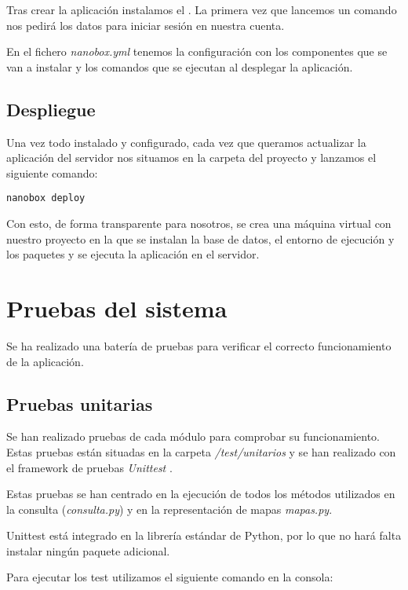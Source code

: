 Tras crear la aplicación instalamos el . La primera vez que lancemos un comando nos pedirá los datos para iniciar sesión en nuestra cuenta.

En el fichero \textit{nanobox.yml} tenemos la configuración con los componentes que se van a instalar y los comandos que se ejecutan al desplegar la aplicación.

\subsection{Despliegue}


Una vez todo instalado y configurado, cada vez que queramos actualizar la aplicación del servidor nos situamos en la carpeta del proyecto y lanzamos el siguiente comando:

\begin{lstlisting}
nanobox deploy
\end{lstlisting}

Con esto, de forma transparente para nosotros, se crea una máquina virtual con nuestro proyecto en la que se instalan la base de datos, el entorno de ejecución y los paquetes y se ejecuta la aplicación en el servidor.

\section{Pruebas del sistema}

Se ha realizado una batería de pruebas para verificar el correcto funcionamiento de la aplicación.

\subsection{Pruebas unitarias}

Se han realizado pruebas de cada módulo para comprobar su funcionamiento. Estas pruebas están situadas en la carpeta \textit{/test/unitarios} y se han realizado con el framework de pruebas \textit{Unittest} \cite{misc:unittest}.

Estas pruebas se han centrado en la ejecución de todos los métodos utilizados en la consulta (\textit{consulta.py}) y en la representación de mapas \textit{mapas.py}.

Unittest está integrado en la librería estándar de Python, por lo que no hará falta instalar ningún paquete adicional. 

Para ejecutar los test utilizamos el siguiente comando en la consola:

